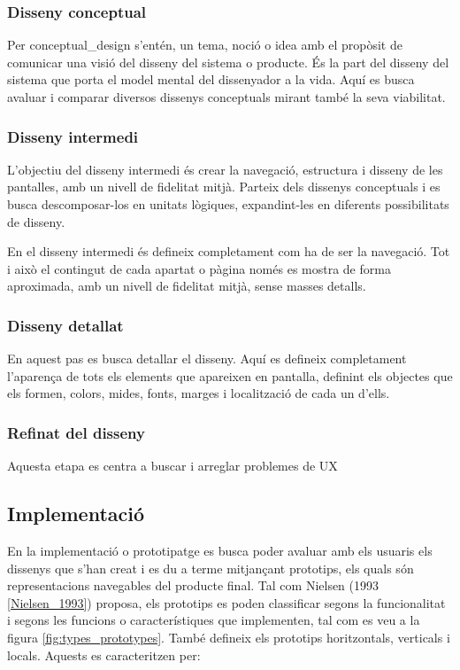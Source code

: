 \subsubsection{Disseny conceptual}
Per \gls{conceptual_design} s'entén, un tema, noció o idea amb el propòsit de comunicar una visió del disseny del sistema o producte. És la part del disseny del sistema que porta el model mental del dissenyador a la vida. 
Aquí es busca avaluar i comparar diversos dissenys conceptuals mirant també la seva viabilitat. 

\subsubsection{Disseny intermedi}
L'objectiu del disseny intermedi és crear la navegació, estructura i disseny de les pantalles, amb un nivell de fidelitat mitjà. Parteix dels dissenys conceptuals i es busca descomposar-los en unitats lògiques, expandint-les en diferents possibilitats de disseny. 

En el disseny intermedi és defineix completament com ha de ser la navegació. Tot i això el contingut de cada apartat o pàgina només es mostra de forma aproximada, amb un nivell de fidelitat mitjà, sense masses detalls. 

\subsubsection{Disseny detallat}
En aquest pas es busca detallar el disseny. Aquí es defineix completament l'aparença de tots els elements que apareixen en pantalla, definint els objectes que els formen, colors, mides, fonts, marges i localització de cada un d'ells. 


\subsubsection{Refinat del disseny}
Aquesta etapa es centra a buscar i arreglar problemes de \ac{UX} 


\subsection{Implementació}
En la implementació o prototipatge es busca poder avaluar amb els usuaris els dissenys que s'han creat i es du a terme mitjançant prototips, els quals són representacions navegables del producte final. Tal com Nielsen (1993 \ref{Nielsen_1993}) proposa, els prototips es poden classificar segons la funcionalitat i segons les funcions o característiques que implementen, tal com es veu a la figura \ref{fig:types_prototypes}. També defineix els prototips horitzontals, verticals i locals. Aquests es caracteritzen per:

